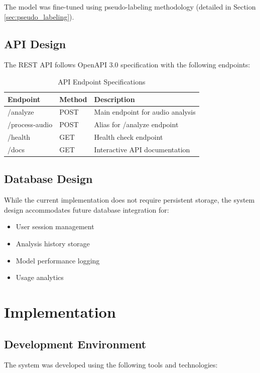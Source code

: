 \documentclass[12pt,a4paper]{report}
\begin{document}
The model was fine-tuned using pseudo-labeling methodology (detailed in Section \ref{sec:pseudo_labeling}).

\subsection{API Design}
The REST API follows OpenAPI 3.0 specification with the following endpoints:

\begin{table}[H]
\centering
\caption{API Endpoint Specifications}
\label{tab:api_endpoints}
\begin{tabular}{@{}llp{6cm}@{}}
\toprule
\textbf{Endpoint} & \textbf{Method} & \textbf{Description} \\ \midrule
/analyze & POST & Main endpoint for audio analysis \\
/process-audio & POST & Alias for /analyze endpoint \\
/health & GET & Health check endpoint \\
/docs & GET & Interactive API documentation \\ \bottomrule
\end{tabular}
\end{table}

\subsection{Database Design}
While the current implementation does not require persistent storage, the system design accommodates future database integration for:

\begin{itemize}
    \item User session management
    \item Analysis history storage
    \item Model performance logging
    \item Usage analytics
\end{itemize}

\section{Implementation}
\subsection{Development Environment}
The system was developed using the following tools and technologies:
\end{document}
